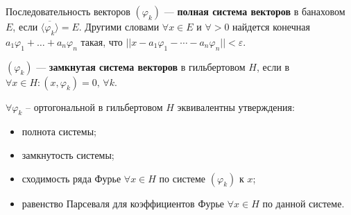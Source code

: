 \begin{to_def}
	Последовательность векторов $(\varphi_k)$ --- \textbf{полная система векторов}  в банаховом $E$, если $\overline{\langle \varphi_k\rangle} = E$. Другими словами $\forall x \in E$ и $\forall >0$ найдется конечная $a_1 \varphi_1 + \ldots + a_n \varphi_n$ такая, что $||x - a_1 \varphi_1 - \cdots - a_n \varphi_n||<\varepsilon$.
\end{to_def}

\begin{to_def}
	$(\varphi_k)$ --- \textbf{замкнутая система векторов} в гильбертовом $H$, если в $\forall x \in H \colon (x, \varphi_k) = 0, \, \forall k$.
\end{to_def}

\begin{to_thr}
	$\forall \varphi_k$ -- ортогональной в гильбертовом $H$ эквивалентны утверждения:
	\begin{itemize}
		\item полнота системы;
		\item замкнутость системы;
		\item сходимость ряда Фурье $\forall x \in H$ по системе $(\varphi_k)$ к $x$;
		\item равенство Парсеваля для коэффициентов Фурье $\forall x \in H$ по данной системе.
	\end{itemize}
\end{to_thr}

